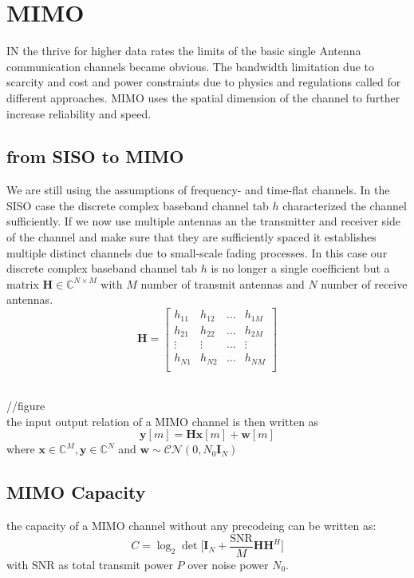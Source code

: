\section{MIMO}
IN the thrive for higher data rates the limits of the basic single Antenna communication channels became obvious. The bandwidth limitation due to scarcity and cost and power constraints due to physics and regulations called for different approaches. MIMO uses the spatial dimension of the channel to further increase reliability and speed.

\subsection{from SISO to MIMO}
We are still using the assumptions of frequency- and time-flat channels. In the SISO case the discrete complex baseband channel tab $h$ characterized the channel sufficiently. If we now use multiple antennas an the transmitter and receiver side of the channel and make sure that they are sufficiently spaced it establishes multiple distinct channels due to small-scale fading processes. In this case our discrete complex baseband channel tab $h$ is no longer a single coefficient but a matrix $\mathbf{H}\in\mathbb{C}^{N\times M}$ with $M$ number of transmit antennas and $N$ number of receive antennas. 
\begin{equation}
	\mathbf{H} = \begin{bmatrix}
		h_{11} & h_{12} & \hdots & h_{1M} \\
		h_{21} & h_{22} & \hdots & h_{2M} \\
		\vdots & \vdots & \hdots & \vdots \\
		h_{N1} & h_{N2} & \hdots & h_{NM} \\
	\end{bmatrix}
\end{equation}

\\
//figure \\
the input output relation of a MIMO channel is then written as 
\begin{equation}
\mathbf{y}[m] = \mathbf{Hx}[m] + \mathbf{w}[m]
\end{equation}
where $\mathbf{x}\in\mathbb{C}^M , \mathbf{y}\in\mathbb{C}^N$ and $\mathbf{w}\sim\mathcal{CN}(0,N_0\mathbf{I}_N)$


\subsection{MIMO Capacity}
the capacity of a MIMO channel without any precodeing can be written as:
\begin{equation}
	C = \log_2{\det{\Biggr[\mathbf{I}_N + \frac{\text{SNR}}{M}\mathbf{HH}^H\Biggl]}}
\end{equation}
with $\text{SNR}$ as total transmit power $P$ over noise power $N_0$.


